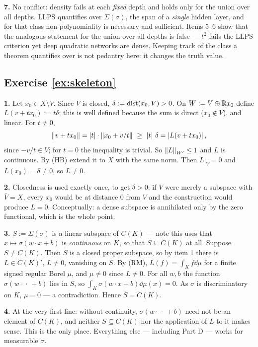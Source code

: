 \documentclass[11pt,a4paper]{article}
\begin{document}
\textbf{7.} No conflict: density fails at each \emph{fixed} depth and holds only for the union over
all depths. LLPS quantifies over $\Sigma(\sigma)$, the span of a \emph{single} hidden layer, and for
that class non-polynomiality is necessary and sufficient. Items 5--6 show that the analogous
statement for the union over all depths is false --- $t^2$ fails the LLPS criterion yet deep
quadratic networks are dense. Keeping track of the class a theorem quantifies over is not pedantry
here: it changes the truth value.

\subsection*{Exercise \ref{ex:skeleton}}

\textbf{1.} Let $x_0 \in X\setminus V$. Since $V$ is closed, $\delta := \operatorname{dist}(x_0,V) > 0$. On
$W := V \oplus \mathbb{R} x_0$ define $L(v + tx_0) := t\delta$; this is well defined because the sum is
direct ($x_0\notin V$), and linear. For $t \ne 0$,
\[
\left\lVert v + tx_0 \right\rVert = \left\lvert t \right\rvert \cdot \left\lVert x_0 + v/t \right\rVert \ \ge\ \left\lvert t \right\rvert\,\delta = \left\lvert L(v+tx_0) \right\rvert,
\]
since $-v/t \in V$; for $t = 0$ the inequality is trivial. So $\left\lVert L \right\rVert_{W'}\le 1$ and $L$ is
continuous. By (HB) extend it to $X$ with the same norm. Then $L|_V = 0$ and $L(x_0) = \delta \ne 0$,
so $L \ne 0$.

\textbf{2.} Closedness is used exactly once, to get $\delta > 0$: if $V$ were merely a subspace with
$\overline V = X$, every $x_0$ would be at distance $0$ from $V$ and the construction would produce
$L = 0$. Conceptually: a dense subspace is annihilated only by the zero functional, which is the
whole point.

\textbf{3.} $S := \Sigma(\sigma)$ is a linear subspace of $C(K)$ --- note this uses that
$x\mapsto\sigma(w\cdot x+b)$ is \emph{continuous} on $K$, so that $S \subseteq C(K)$ at all.
Suppose $\overline S \ne C(K)$. Then $\overline S$ is a closed proper subspace, so by item 1 there
is $L \in C(K)'$, $L \ne 0$, vanishing on $\overline S$. By (RM), $L(f) = \int_K f\dd\mu$ for a
finite signed regular Borel $\mu$, and $\mu \ne 0$ since $L\ne0$. For all $w,b$ the function
$\sigma(w\cdot{\,\cdot\,}+b)$ lies in $S$, so $\int_K\sigma(w\cdot x+b)\dd\mu(x) = 0$. As $\sigma$
is discriminatory on $K$, $\mu = 0$ --- a contradiction. Hence $\overline S = C(K)$.

\textbf{4.} At the very first line: without continuity, $\sigma(w\cdot{\,\cdot\,}+b)$ need not be an
element of $C(K)$, and neither $S \subseteq C(K)$ nor the application of $L$ to it makes sense. This
is the only place. Everything else --- including Part D --- works for measurable $\sigma$.
\end{document}

